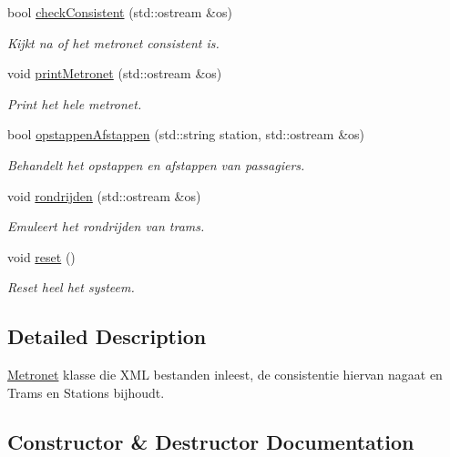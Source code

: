 \begin{DoxyCompactItemize}
bool \hyperlink{class_metronet_a3125e980b208f1cdd04a9c26ec92a7bf}{check\+Consistent} (std\+::ostream \&os)
\begin{DoxyCompactList}\small\item\em Kijkt na of het metronet consistent is. \end{DoxyCompactList}\item 
void \hyperlink{class_metronet_a3d8b85c241fff3a9353c06320226e84e}{print\+Metronet} (std\+::ostream \&os)
\begin{DoxyCompactList}\small\item\em Print het hele metronet. \end{DoxyCompactList}\item 
bool \hyperlink{class_metronet_a78c0cd9912306a5f7438ea43f5088e0a}{opstappen\+Afstappen} (std\+::string station, std\+::ostream \&os)
\begin{DoxyCompactList}\small\item\em Behandelt het opstappen en afstappen van passagiers. \end{DoxyCompactList}\item 
void \hyperlink{class_metronet_a180b666c7d4cc52f873579ab7f95ea35}{rondrijden} (std\+::ostream \&os)
\begin{DoxyCompactList}\small\item\em Emuleert het rondrijden van trams. \end{DoxyCompactList}\item 
void \hyperlink{class_metronet_aae72fb7ad05324adb1ccc6a1519c5c0b}{reset} ()
\begin{DoxyCompactList}\small\item\em Reset heel het systeem. \end{DoxyCompactList}\end{DoxyCompactItemize}


\subsection{Detailed Description}
\hyperlink{class_metronet}{Metronet} klasse die X\+ML bestanden inleest, de consistentie hiervan nagaat en Trams en Stations bijhoudt. 

\subsection{Constructor \& Destructor Documentation}
\mbox{\label{class_metronet_abdd205c39857ed1aabd104a6886cad45}} 

